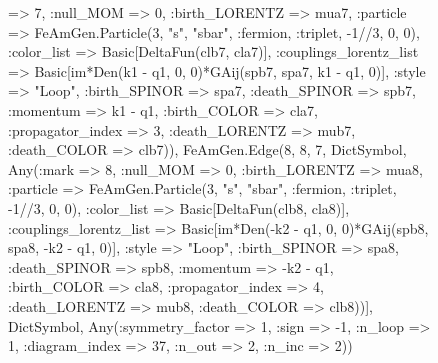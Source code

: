 \documentclass{revtex4}
\begin{document}
\begin{figure}[!htb]
\begin{center}
{=> 7, :null_MOM => 0, :birth_LORENTZ => mua7, :particle => FeAmGen.Particle(3, "s", "sbar", :fermion, :triplet, -1//3, 0, 0), :color_list => Basic[DeltaFun(clb7, cla7)], :couplings_lorentz_list => Basic[im*Den(k1 - q1, 0, 0)*GAij(spb7, spa7, k1 - q1, 0)], :style => "Loop", :birth_SPINOR => spa7, :death_SPINOR => spb7, :momentum => k1 - q1, :birth_COLOR => cla7, :propagator_index => 3, :death_LORENTZ => mub7, :death_COLOR => clb7)), FeAmGen.Edge(8, 8, 7, Dict{Symbol, Any}(:mark => 8, :null_MOM => 0, :birth_LORENTZ => mua8, :particle => FeAmGen.Particle(3, "s", "sbar", :fermion, :triplet, -1//3, 0, 0), :color_list => Basic[DeltaFun(clb8, cla8)], :couplings_lorentz_list => Basic[im*Den(-k2 - q1, 0, 0)*GAij(spb8, spa8, -k2 - q1, 0)], :style => "Loop", :birth_SPINOR => spa8, :death_SPINOR => spb8, :momentum => -k2 - q1, :birth_COLOR => cla8, :propagator_index => 4, :death_LORENTZ => mub8, :death_COLOR => clb8))], Dict{Symbol, Any}(:symmetry_factor => 1, :sign => -1, :n_loop => 1, :diagram_index => 37, :n_out => 2, :n_inc => 2)) 
}
\end{center}
\end{figure}
\end{document}
